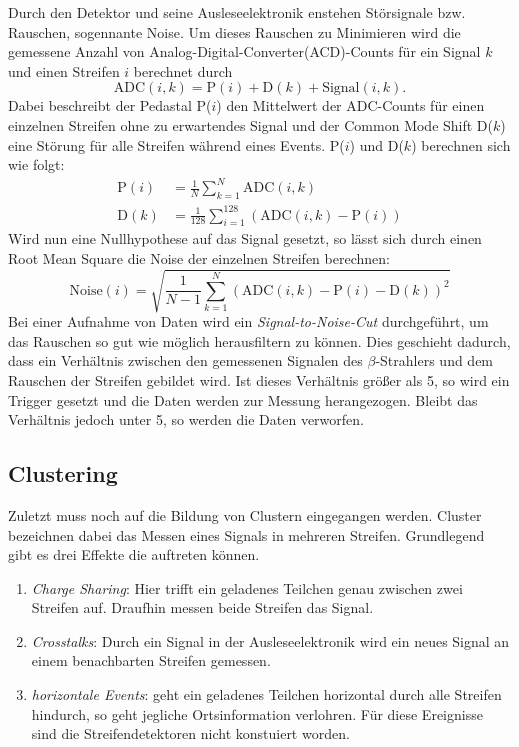 Durch den Detektor und seine Ausleseelektronik enstehen Störsignale bzw. Rauschen,
sogennante Noise. Um dieses Rauschen zu Minimieren wird die gemessene Anzahl von
Analog-Digital-Converter(ACD)-Counts für ein Signal $k$ und einen Streifen $i$
berechnet durch
\begin{equation}
  \text{ADC}(i, k) = \text{P}(i) + \text{D}(k) + \text{Signal}(i, k).
\end{equation}
Dabei beschreibt der Pedastal P($i$) den Mittelwert der ADC-Counts für einen
einzelnen Streifen ohne zu erwartendes Signal und der Common Mode Shift D($k$)
eine Störung für alle Streifen während eines Events. P($i$) und D($k$) berechnen
sich wie folgt:
\begin{align}
  \text{P}(i) &= \frac{1}{N} \sum_{k=1}^N \text{ADC}(i, k) \\
  \text{D}(k) &= \frac{1}{128} \sum_{i=1}^{128} \left(\text{ADC}(i, k) - \text{P}(i) \right)
\end{align}
Wird nun eine Nullhypothese auf das Signal gesetzt, so lässt sich durch einen
Root Mean Square die Noise der einzelnen Streifen berechnen:
\begin{equation}
  \text{Noise}(i) = \sqrt{ \frac{1}{N-1} \sum_{k=1}^N \left(\text{ADC}(i,k) - \text{P} (i) - \text{D}(k)\right)^2 }
\end{equation}
Bei einer Aufnahme von Daten wird ein \textit{Signal-to-Noise-Cut} durchgeführt,
um das Rauschen so gut wie möglich herausfiltern zu können. Dies geschieht
dadurch, dass ein Verhältnis zwischen den gemessenen Signalen des $\beta$-Strahlers
und dem Rauschen der Streifen gebildet wird. Ist dieses Verhältnis größer als 5,
so wird ein Trigger gesetzt und die Daten werden zur Messung herangezogen. Bleibt
das Verhältnis jedoch unter 5, so werden die Daten verworfen.

\subsection{Clustering}
\label{sec:Clustering}
Zuletzt muss noch auf die Bildung von Clustern eingegangen werden. Cluster
bezeichnen dabei das Messen eines Signals in mehreren Streifen. Grundlegend
gibt es drei Effekte die auftreten können.
\begin{enumerate}
  \item \textit{Charge Sharing}: Hier trifft ein geladenes Teilchen genau
  zwischen zwei Streifen auf. Draufhin messen beide Streifen das Signal.
  \item \textit{Crosstalks}: Durch ein Signal in der Ausleseelektronik wird ein
  neues Signal an einem benachbarten Streifen gemessen.
  \item \textit{horizontale Events}: geht ein geladenes Teilchen horizontal durch
  alle Streifen hindurch, so geht jegliche Ortsinformation verlohren. Für diese
  Ereignisse sind die Streifendetektoren nicht konstuiert worden.
\end{enumerate}
